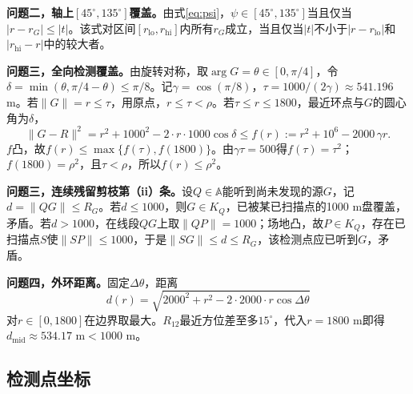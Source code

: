 \documentclass{cumcmthesis}
\begin{document}
\textbf{问题二，轴上$[45^\circ,135^\circ]$覆盖。}由式\eqref{eq:psi}，$\psi\in[45^\circ,135^\circ]$当且仅当$|r-r_G|\le|t|$。该式对区间$[r_{\mathrm{lo}},r_{\mathrm{hi}}]$内所有$r_G$成立，当且仅当$|t|$不小于$|r-r_{\mathrm{lo}}|$和$|r_{\mathrm{hi}}-r|$中的较大者。

\textbf{问题三，全向检测覆盖。}由旋转对称，取$\arg G=\theta\in[0,\pi/4]$，令$\delta=\min(\theta,\pi/4-\theta)\le\pi/8$。记$\gamma=\cos(\pi/8)$，$\tau=1000/(2\gamma)\approx 541.196$ m。若$\|G\|=r\le\tau$，用原点，$r\le\tau<\rho$。若$\tau\le r\le 1800$，最近环点与$G$的圆心角为$\delta$，
\[
\|G-R\|^2=r^2+1000^2-2\cdot r\cdot 1000\cos\delta\le f(r):=r^2+10^6-2000\,\gamma r.
\]
$f$凸，故$f(r)\le\max\{f(\tau),f(1800)\}$。由$\gamma\tau=500$得$f(\tau)=\tau^2$；$f(1800)=\rho^2$，且$\tau<\rho$，所以$f(r)\le\rho^2$。

\textbf{问题三，连续残留剪枝第（ii）条。}设$Q\in\mathbb{A}$能听到尚未发现的源$G$，记$d=\|QG\|\le R_G$。若$d\le 1000$，则$G\in K_Q$，已被某已扫描点的1000 m盘覆盖，矛盾。若$d>1000$，在线段$QG$上取$\|QP\|=1000$；场地凸，故$P\in K_Q$，存在已扫描点$S$使$\|SP\|\le 1000$，于是$\|SG\|\le d\le R_G$，该检测点应已听到$G$，矛盾。

\textbf{问题四，外环距离。}固定$\Delta\theta$，距离
\[
d(r)=\sqrt{2000^2+r^2-2\cdot 2000\cdot r\cos\Delta\theta}
\]
对$r\in[0,1800]$在边界取最大。$R_{12}$最近方位差至多$15^\circ$，代入$r=1800$ m即得$d_{\mathrm{mid}}\approx 534.17$ m$<1000$ m。

\subsection{检测点坐标}
\end{document}
